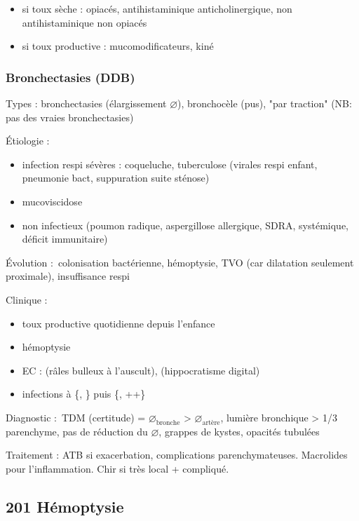 \documentclass[11pt]{article}
\begin{document}
\begin{itemize}
\item si toux sèche : opiacés, antihistaminique anticholinergique, non
antihistaminique non opiacés
\item si toux productive : mucomodificateurs, kiné
\end{itemize}


\subsubsection{Bronchectasies (DDB)}
\label{sec:orgf2ce6cc}
\label{sub:bronchectasies}
Types : bronchectasies (élargissement \(\diameter\)), bronchocèle (pus), "par
traction" (NB: pas des vraies bronchectasies)

Étiologie :

\begin{itemize}
\item infection respi sévères : coqueluche, tuberculose (virales respi enfant,
pneumonie bact, suppuration suite sténose)
\item mucoviscidose
\item non infectieux (poumon radique, aspergillose allergique, SDRA,
systémique, déficit immunitaire)
\end{itemize}

Évolution : colonisation bactérienne, hémoptysie, TVO (car dilatation seulement
proximale), insuffisance respi

Clinique :

\begin{itemize}
\item toux productive quotidienne depuis l'enfance
\item hémoptysie
\item EC : (râles bulleux à l'auscult), (hippocratisme digital)
\item infections à \{, \} puis \{,
++\}
\end{itemize}


Diagnostic : TDM (certitude) = \(\diameter_\text{bronche}\) > \(\diameter_\text{artère}\), lumière
bronchique > 1/3 parenchyme, pas de réduction du \(\diameter\), grappes de kystes,
opacités tubulées

Traitement : ATB si exacerbation, complications parenchymateuses. Macrolides
pour l'inflammation. Chir si très local + compliqué.

\subsection{201 \textdagger{} Hémoptysie}
\label{sec:orgb8f6103}
\label{sec:201_hemoptysie}
\end{document}
